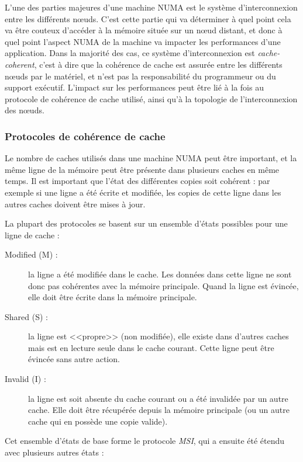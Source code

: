 L'une des parties majeures d'une machine NUMA est le système d'interconnexion entre les différents nœuds.
C'est cette partie qui va déterminer à quel point cela va être couteux d'accéder à la mémoire située sur un nœud distant, et donc à quel point l'aspect NUMA de la machine va impacter les performances d'une application.
Dans la majorité des cas, ce système d'interconnexion est \emph{cache-coherent}, c'est à dire que la cohérence de cache est assurée entre les différents nœuds par le matériel, et n'est pas la responsabilité du programmeur ou du support exécutif.
L'impact sur les performances peut être lié à la fois au protocole de cohérence de cache utilisé, ainsi qu'à la topologie de l'interconnexion des nœuds.


\subsubsection{Protocoles de cohérence de cache}

Le nombre de caches utilisés dans une machine NUMA peut être important, et la même ligne de la mémoire peut être présente dans plusieurs caches en même temps.
Il est important que l'état des différentes copies soit cohérent : par exemple si une ligne a été écrite et modifiée, les copies de cette ligne dans les autres caches doivent être mises à jour.

La plupart des protocoles se basent sur un ensemble d'états possibles pour une ligne de cache :

\begin{description}
  \item [Modified (M) :] la ligne a été modifiée dans le cache. Les données dans cette ligne ne sont donc pas cohérentes avec la mémoire principale. Quand la ligne est évincée, elle doit être écrite dans la mémoire principale.
  \item [Shared (S) :] la ligne est <<propre>> (non modifiée), elle existe dans d'autres caches mais est en lecture seule dans le cache courant. Cette ligne peut être évincée sans autre action.
  \item [Invalid (I) :] la ligne est soit absente du cache courant ou a été invalidée par un autre cache. Elle doit être récupérée depuis la mémoire principale (ou un autre cache qui en possède une copie valide).
\end{description}

Cet ensemble d'états de base forme le protocole \emph{MSI}, qui a ensuite été étendu avec plusieurs autres états :

